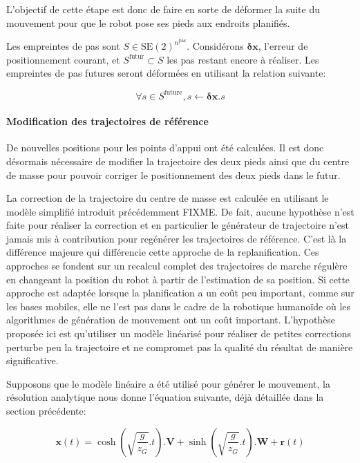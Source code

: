 L'objectif de cette étape est donc de faire en sorte de déformer la
suite du mouvement pour que le robot pose ses pieds aux endroits
planifiés.

Les empreintes de pas sont \mbox{$S \in
  \text{SE}(2)^{n^\text{pas}}$}. Considérons $\mathbf{\delta {x}}$,
l'erreur de positionnement courant, et \mbox{$S^{\text{futur}} \subset
  S$} les pas restant encore à réaliser. Les empreintes de pas futures
seront déformées en utilisant la relation suivante:

\begin{equation}\label{eq:footstepmodif}
  \forall s \in S^{\text{future}}, s \gets \mathbf{\delta {x}} . s
\end{equation}

\paragraph{Modification des trajectoires de référence}

De nouvelles positions pour les points d'appui ont été calculées. Il
est donc désormais nécessaire de modifier la trajectoire des deux
pieds ainsi que du centre de masse pour pouvoir corriger le
positionnement des deux pieds dans le futur.

La correction de la trajectoire du centre de masse est calculée en
utilisant le modèle simplifié introduit précédemment FIXME. De fait,
aucune hypothèse n'est faite pour réaliser la correction et en
particulier le générateur de trajectoire n'est jamais mis à
contribution pour regénérer les trajectoires de référence. C'est là la
différence majeure qui différencie cette approche de la
replanification. Ces approches se fondent sur un recalcul complet des
trajectoires de marche régulère en changeant la position du robot à
partir de l'estimation de sa position. Si cette approche est adaptée
lorsque la planification a un coût peu important, comme sur les bases
mobiles, elle ne l'est pas dans le cadre de la robotique humanoïde où
les algorithmes de génération de mouvement ont un coût
important. L'hypothèse proposée ici est qu'utiliser un modèle
linéarisé pour réaliser de petites corrections perturbe peu la
trajectoire et ne compromet pas la qualité du résultat de manière
significative.


Supposons que le modèle linéaire a été utilisé pour générer le
mouvement, la résolution analytique nous donne l'équation suivante,
déjà détaillée dans la section précédente:

\begin{equation} \label{eq:zmpsol}
  \mathbf{x}(t) = \cosh(\sqrt{\frac{g}{z_G}}.t) . \mathbf{V} + \sinh(\sqrt{\frac{g}{z_G}}.t) . \mathbf{W} + \mathbf{r}(t)
\end{equation}


